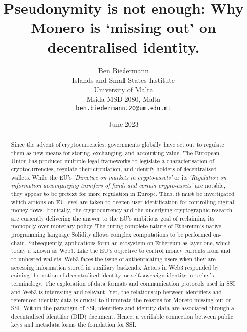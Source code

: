 \documentclass[a4,10pt]{article}
\title{\textbf{Pseudonymity is not enough: Why Monero is ‘missing out’ on decentralised identity.}}
\date{June 2023}
\author{
 Ben Biedermann \\
  Islands and Small States Institute\\
  University of Malta\\
  Msida MSD 2080, Malta \\
  \texttt{ben.biedermann.20@um.edu.mt} \\}
\begin{document}
\maketitle

\begin{abstract}
Since the advent of cryptocurrencies, governments globally have set out to regulate them as new means for storing, exchanging, and accounting value. The European Union has produced multiple legal frameworks to legislate a characterisation of cryptocurrencies, regulate their circulation, and identify holders of decentralised wallets. While the EU’s \textit{‘Directive on markets in crypto-assets’} or its \textit{‘Regulation on information accompanying transfers of funds and certain crypto-assets’} are notable, they appear to be pretext for more regulation in Europe. Thus, it must be investigated which actions on EU-level are taken to deepen user identification for controlling digital money flows. Ironically, the cryptocurrency and the underlying cryptographic research are currently delivering the answer to the EU’s ambitious goal of reclaiming its monopoly over monetary policy. The turing-complete nature of Ethereum’s native programming language Solidity allows complex computations to be performed on-chain. Subsequently, applications form an ecosystem on Ethereum as layer one, which today is known as Web3. Like the EU’s objective to control money currents from and to unhosted wallets, Web3 faces the issue of authenticating users when they are accessing information stored in auxiliary backends. Actors in Web3 responded by coining the notion of decentralised identity, or self-sovereign identity in today’s terminology. The exploration of data formats and communication protocols used in SSI and Web3 is interesting and relevant. Yet, the relationship between identifiers and referenced identity data is crucial to illuminate the reasons for Monero missing out on SSI. Within the paradigm of SSI, identifiers and identity data are associated through a decentralised identifier (DID) document. Hence, a verifiable connection between public keys and metadata forms the foundation for SSI.\\


\end{abstract}
\end{document}
